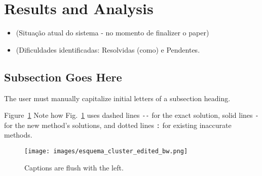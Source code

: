 \documentclass{anstrans}
\begin{document}
\section{Results and Analysis}

\begin{itemize}

\item (Situação atual do sistema - no momento de finalizer o paper)
\item (Dificuldades identificadas: Resolvidas (como) e Pendentes.
  
\end{itemize}

\subsection{Subsection Goes Here}
The user must manually capitalize initial letters of a subsection heading.

Figure~\ref{fig:esquema-cluster}
Note how Fig.~\ref{fig:esquema-cluster} uses dashed lines \verb|--| for the exact
solution, solid lines \verb|-| for the new method's solutions, and dotted lines
\verb|:| for existing inaccurate methods.
\begin{figure}[ht] %
  \centering
  \texttt{[image: images/esquema\_cluster\_edited\_bw.png]}
  \caption{Captions are flush with the left.}
  \label{fig:esquema-cluster}
\end{figure}

\end{document}
